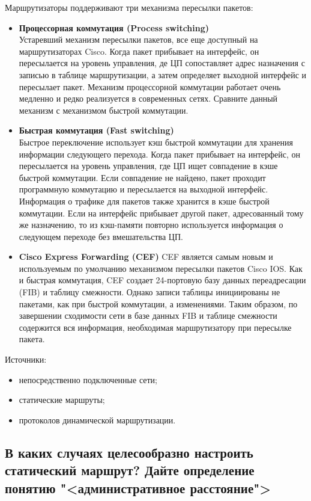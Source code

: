 Маршрутизаторы поддерживают три механизма пересылки пакетов:

\begin{itemize}
	\item \textbf{Процессорная коммутация (Process switching)}\\
		Устаревший механизм пересылки пакетов, все еще доступный на 
		маршрутизаторах Cisco. Когда пакет прибывает на интерфейс, он 
		пересылается на уровень управления,
		де ЦП сопоставляет адрес назначения 
		с записью в таблице маршрутизации, а затем определяет выходной 
		интерфейс и пересылает пакет. Механизм процессорной коммутации 
		работает очень медленно и редко реализуется в современных сетях.
		Сравните данный механизм с механизмом быстрой коммутации.
	\item \textbf{Быстрая коммутация (Fast switching)}\\
		Быстрое переключение использует кэш быстрой коммутации для 
		хранения информации следующего перехода. Когда пакет прибывает на 
		интерфейс, он пересылается на уровень управления,
		где ЦП ищет совпадение 
		в кэше быстрой коммутации. Если совпадение не найдено, пакет проходит 
		программную коммутацию и пересылается на выходной интерфейс. 
		Информация о трафике для пакетов также хранится в кэше быстрой 
		коммутации. Если на интерфейс прибывает другой пакет,
		адресованный тому 
		же назначению, то из кэш-памяти повторно используется информация о 
		следующем переходе без вмешательства ЦП.
	\item \textbf{Cisco Express Forwarding (CEF)}
		CEF является самым новым и используемым по умолчанию 
		механизмом пересылки пакетов Cisco IOS. Как и быстрая коммутация, CEF 
		создает 24-портовую базу данных переадресации (FIB)
		и таблицу смежности. 
		Однако записи таблицы инициированы не пакетами, как при быстрой 
		коммутации, а изменениями. Таким образом,
		по завершении сходимости сети 
		в базе данных FIB и таблице смежности содержится вся информация, 
		необходимая маршрутизатору при пересылке пакета.
\end{itemize}

Источники:

\begin{itemize}
	\item непосредственно подключенные сети;
	\item статические маршруты;
	\item протоколов динамической маршрутизации.
\end{itemize}

\subsection{В каких случаях целесообразно настроить статический 
	маршрут? Дайте определение понятию "<административное расстояние">}


